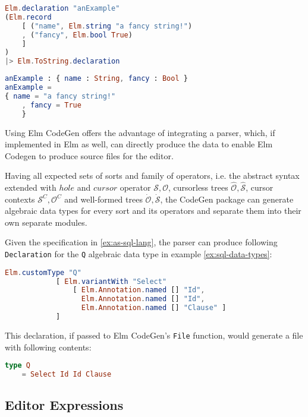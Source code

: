 \documentclass[sigplan,screen]{acmart}
\begin{document}
\begin{lstlisting}[language=elm,caption={An Elm CodeGen declaration passed to the ToString function},label={lst:decl-codegen-ex}]
Elm.declaration "anExample"
(Elm.record
    [ ("name", Elm.string "a fancy string!")
    , ("fancy", Elm.bool True)
    ]
)
|> Elm.ToString.declaration
\end{lstlisting}

\begin{lstlisting}[language=elm,caption={Result after running code generation via the Elm-CodeGen CLI},label={lst:decl-codegen-gen}]
anExample : { name : String, fancy : Bool }
anExample =
{ name = "a fancy string!"
    , fancy = True
    }
\end{lstlisting}

Using Elm CodeGen offers the advantage of integrating a parser, which,
if implemented in Elm as well, can directly produce the data to enable
Elm Codegen to produce source files for the editor.

Having all expected sets of sorts and family of operators,
i.e. the abstract syntax extended with $hole$ and $cursor$ operator $\mathcal{S},
  \mathcal{O}$, cursorless trees $\hat{\mathcal{O}},\hat{\mathcal{S}}$,
cursor contexts $\mathcal{S}^C,\mathcal{O}^C$ and
well-formed trees $\dot{\mathcal{O}},\dot{\mathcal{S}}$,
the CodeGen package can generate algebraic data types for every sort and its operators
and separate them into their own separate modules.

\begin{example}\label{ex:parser-to-elm-codegen}
  Given the specification in \cref{ex:as-sql-lang}, the parser can produce following \texttt{Declaration} for the \texttt{Q} algebraic data type in example \cref{ex:sql-data-types}:
  \begin{lstlisting}[language=elm]
Elm.customType "Q"
            [ Elm.variantWith "Select"
                [ Elm.Annotation.named [] "Id",
                  Elm.Annotation.named [] "Id",
                  Elm.Annotation.named [] "Clause" ]
            ]
\end{lstlisting}

  This declaration, if passed to Elm CodeGen's \texttt{File} function, would generate a file with following contents:
  \begin{lstlisting}[language=elm]
type Q
    = Select Id Id Clause
\end{lstlisting}
\end{example}

\subsection{Editor Expressions}
\end{document}
